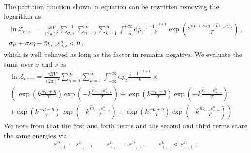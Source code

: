 The partition function shown in equation  can be rewritten removing the logarithm as
\begin{gather}
\label{partitionpower:1}
\ln{\mathcal{Z}_{e^{+}e^{-}}}=\frac{e{B}V}{(2\pi)^{2}}\sum_{\sigma,s}^{\pm1}\sum_{n=0}^{\infty}\sum_{k=1}^{\infty}\int_{-\infty}^{+\infty}\mathrm{d}p_{z}
\frac{(-1)^{k+1}}{k}\exp\left({k\frac{\sigma\mu+\sigma s\eta-{\tilde m}_{\sigma,s}\varepsilon^{n}_{\sigma,s}}{T}}\right)\,,\\
\label{bapprox} 
\sigma\mu+\sigma s\eta-{\tilde m}_{\sigma,s}\varepsilon_{\sigma,s}^{n}<0\,,
\end{gather}
which is well behaved as long as the factor in  remains negative. We evaluate the sums over $\sigma$ and $s$ as
\begin{multline}
    \label{partitionpower:2}
    \ln{\mathcal{Z}_{e^{+}e^{-}}}=\frac{e{B}V}{(2\pi)^{2}}\sum_{n=0}^{\infty}\sum_{k=1}^{\infty}\int_{-\infty}^{+\infty}\mathrm{d}p_{z}\frac{(-1)^{k+1}}{k}\times\\
    \left(\ \exp\left(k\frac{+\mu+\eta}{T}\right)\exp\left(-k\frac{{\tilde m}_{+,+}\varepsilon_{+,+}^{n}}{T}\right)\right.
    +\exp\left(k\frac{+\mu-\eta}{T}\right)\exp\left(-k\frac{{\tilde m}_{+,-}\varepsilon_{+,-}^{n}}{T}\right)\qquad\\
    +\exp\left(k\frac{-\mu-\eta}{T}\right)\exp\left(-k\frac{{\tilde m}_{-,+}\varepsilon_{-,+}^{n}}{T}\right)
    +\left.\exp\left(k\frac{-\mu+\eta}{T}\right)\exp\left(-k\frac{{\tilde m}_{-,-}\varepsilon_{-,-}^{n}}{T}\right)\right)
\end{multline}
We note from  that the first and forth terms and the second and third terms share the same energies via
\begin{align}
    \label{partitionpower:3}
    \varepsilon_{+,+}^{n}=\varepsilon_{-,-}^{n}\,,\qquad
    \varepsilon_{+,-}^{n}=\varepsilon_{-,+}^{n}\,.\qquad
    \varepsilon_{+,-}^{n}<\varepsilon_{+,+}^{n}\,,
\end{align}

